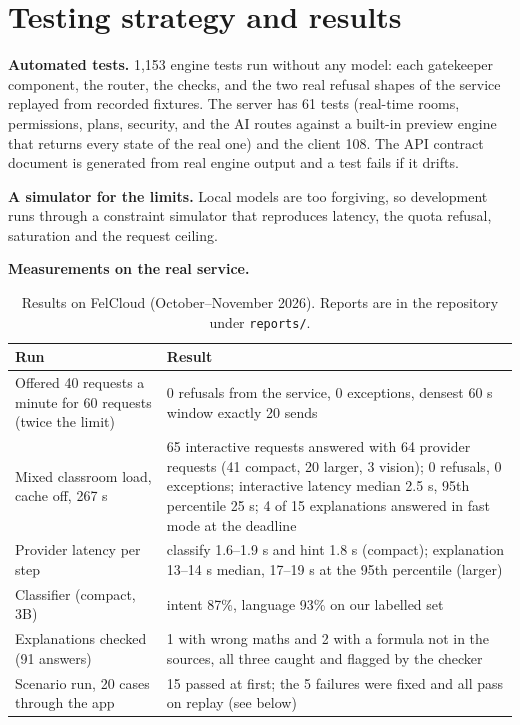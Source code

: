\documentclass[11pt,a4paper]{article}
\newcommand{\code}[1]{\texttt{\small #1}}
\begin{document}
\section{Testing strategy and results}

\textbf{Automated tests.} 1{,}153 engine tests run without any model: each gatekeeper component, the router, the
checks, and the two real refusal shapes of the service replayed from recorded fixtures. The server has 61 tests
(real-time rooms, permissions, plans, security, and the AI routes against a built-in preview engine that returns
every state of the real one) and the client 108. The API contract document is generated from real engine output and
a test fails if it drifts.

\textbf{A simulator for the limits.} Local models are too forgiving, so development runs through a constraint
simulator that reproduces latency, the quota refusal, saturation and the request ceiling.

\textbf{Measurements on the real service.}

\begin{table}[H]
\centering\small
\begin{tabularx}{\textwidth}{@{}p{5.3cm}Y@{}}
\toprule
\textbf{Run} & \textbf{Result} \\
\midrule
Offered 40 requests a minute for 60 requests (twice the limit) & 0 refusals from the service, 0 exceptions, densest 60 s window exactly 20 sends \\
Mixed classroom load, cache off, 267 s & 65 interactive requests answered with 64 provider requests (41 compact, 20 larger, 3 vision); 0 refusals, 0 exceptions; interactive latency median 2.5 s, 95th percentile 25 s; 4 of 15 explanations answered in fast mode at the deadline \\
Provider latency per step & classify 1.6--1.9 s and hint 1.8 s (compact); explanation 13--14 s median, 17--19 s at the 95th percentile (larger) \\
Classifier (compact, 3B) & intent 87\%, language 93\% on our labelled set \\
Explanations checked (91 answers) & 1 with wrong maths and 2 with a formula not in the sources, all three caught and flagged by the checker \\
Scenario run, 20 cases through the app & 15 passed at first; the 5 failures were fixed and all pass on replay (see below) \\
\bottomrule
\end{tabularx}
\caption{Results on FelCloud (October--November 2026). Reports are in the repository under \code{reports/}.}
\end{table}
\vspace{-6pt}
\end{document}

